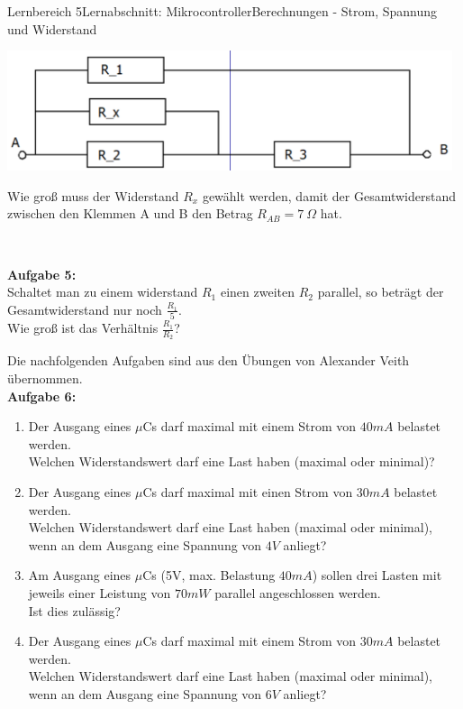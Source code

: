 \documentclass[oneside,openany,headings=optiontotoc,11pt,numbers=noenddot]{scrreprt}
\begin{document}
\begin{worksheet}{Lernbereich 5}{Lernabschnitt: Mikrocontroller}{Berechnungen - Strom, Spannung und Widerstand}
\begin{framed}
\begin{minipage}{0.58\textwidth}
					\includegraphics[width=0.98\textwidth]{../99_Bilder/A4.png}
				\end{minipage}
				\hfill
				\begin{minipage}{0.38\textwidth}
					Wie groß muss der Widerstand \(R_x\) gewählt werden, damit der Gesamtwiderstand zwischen den Klemmen A und B den Betrag \(R_{AB} = 7\ \Omega\) hat.
				\end{minipage}\\
				\par\noindent
				\textbf{Aufgabe 5:}\\
				Schaltet man zu einem widerstand \(R_1\) einen zweiten \(R_2\) parallel, so beträgt der Gesamtwiderstand nur noch \(\frac{R_1}{5}\).\\
				Wie groß ist das Verhältnis \(\frac{R_1}{R_2}\)?\\
				\par\noindent
				\tiny{Die nachfolgenden Aufgaben sind aus den Übungen von Alexander Veith übernommen.}\normalsize\\
				\textbf{Aufgabe 6:}\\
				\begin{enumerate}[label=(\alph*)]
					\item Der Ausgang eines \(\mu\)Cs darf maximal mit einem Strom von \(40mA\) belastet werden.\\
					Welchen Widerstandswert darf eine Last haben (maximal oder minimal)?
					\item Der Ausgang eines \(\mu\)Cs darf maximal mit einen Strom von \(30mA\) belastet werden.\\
					Welchen Widerstandswert darf eine Last haben (maximal oder minimal), wenn an dem Ausgang eine Spannung von \(4V\) anliegt?
					\item Am Ausgang eines \(\mu\)Cs (5V, max. Belastung \(40mA\)) sollen drei Lasten mit jeweils einer Leistung von \(70mW\) parallel angeschlossen werden.\\
					Ist dies zulässig?
					\item Der Ausgang eines \(\mu\)Cs darf maximal mit einem Strom von \(30mA\) belastet werden.\\
					Welchen Widerstandswert darf eine Last haben (maximal oder minimal), wenn an dem Ausgang eine Spannung von \(6V\) anliegt?

\end{enumerate}
\end{framed}
\end{worksheet}
\end{document}
